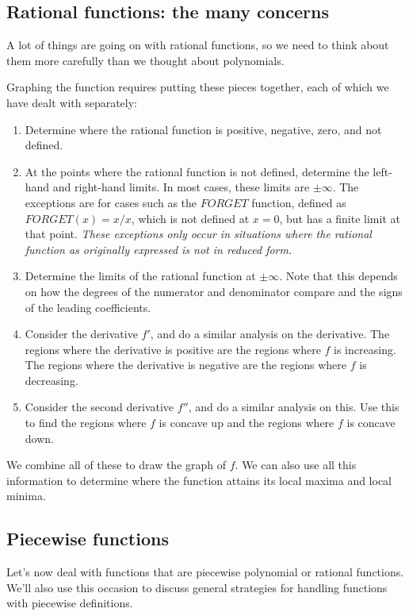 \documentclass[10pt]{amsart}
\begin{document}
\subsection{Rational functions: the many concerns}

A lot of things are going on with rational functions, so we need to
think about them more carefully than we thought about polynomials.

Graphing the function requires putting these pieces together, each of
which we have dealt with separately:

\begin{enumerate}
\item Determine where the rational function is positive, negative,
  zero, and not defined.
\item At the points where the rational function is not defined,
  determine the left-hand and right-hand limits. In most cases, these
  limits are $\pm \infty$. The exceptions are for cases such as the
  $FORGET$ function, defined as $FORGET(x) = x/x$, which is not
  defined at $x = 0$, but has a finite limit at that point. {\em These
  exceptions only occur in situations where the rational function as
  originally expressed is not in reduced form.}
\item Determine the limits of the rational function at $\pm
  \infty$. Note that this depends on how the degrees of the numerator
  and denominator compare and the signs of the leading coefficients.
\item Consider the derivative $f'$, and do a similar analysis on the
  derivative. The regions where the derivative is positive are the
  regions where $f$ is increasing. The regions where the derivative is
  negative are the regions where $f$ is decreasing.
\item Consider the second derivative $f''$, and do a similar analysis
  on this. Use this to find the regions where $f$ is concave up and
  the regions where $f$ is concave down.
\end{enumerate}

We combine all of these to draw the graph of $f$. We can also use all
this information to determine where the function attains its local
maxima and local minima.

\subsection{Piecewise functions}

Let's now deal with functions that are piecewise polynomial or
rational functions. We'll also use this occasion to discuss general
strategies for handling functions with piecewise definitions.
\end{document}
